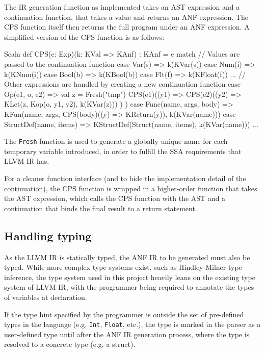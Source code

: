The IR generation function as implemented takes an AST expression and a continuation function, that
takes a value and returns an ANF expression. The CPS function itself then returns the full program
under an ANF expression. A simplified version of the CPS function is as follows:

\begin{code}{Scala}
    def CPS(e: Exp)(k: KVal => KAnf) : KAnf = e match {
        // Values are passed to the continuation function
        case Var(s) => k(KVar(s))
        case Num(i) => k(KNum(i))
        case Bool(b) => k(KBool(b))
        case Flt(f) => k(KFloat(f))
        ...
        // Other expressions are handled by creating a new continuation function
        case Op(e1, o, e2) => {
            val z = Fresh("tmp")
            CPS(e1)((y1) =>
                CPS(e2)((y2) =>
                    KLet(z, Kop(o, y1, y2), k(KVar(z)))
                )
            )
        }
        case Func(name, args, body) =>
            KFun(name, args, CPS(body)((y) => KReturn(y)), k(KVar(name)))
        case StructDef(name, items) =>
            KStructDef(Struct(name, items), k(KVar(name)))
        ...
    }
\end{code}

The \texttt{Fresh} function is used to generate a globally unique name for each temporary variable
introduced, in order to fulfill the SSA requirements that LLVM IR has.

For a cleaner function interface (and to hide the implementation detail of the continuation), the
CPS function is wrapped in a higher-order function that takes the AST expression, which calls the
CPS function with the AST and a continuation that binds the final result to a return statement.

\subsection{Handling typing}

As the LLVM IR is statically typed, the ANF IR to be generated must also be typed. While more
complex type systems exist, such as Hindley-Milner type inference, the type system used in this
project heavily leans on the existing type system of LLVM IR, with the programmer being required to
annotate the types of variables at declaration.

If the type hint specified by the programmer is outside the set of pre-defined types in the language
(e.g. \texttt{Int}, \texttt{Float}, etc.), the type is marked in the parser as a user-defined type
until after the ANF IR generation process, where the type is resolved to a concrete type (e.g. a
struct).

